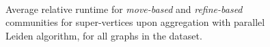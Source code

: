 \begin{figure}[hbtp]
  \centering
   \\[-2ex]
  \caption{Average relative runtime for \textit{move-based} and \textit{refine-based} communities for super-vertices upon aggregation with parallel Leiden algorithm, for all graphs in the dataset.}
  \label{fig:leidenreopt-runtime}
\end{figure}
